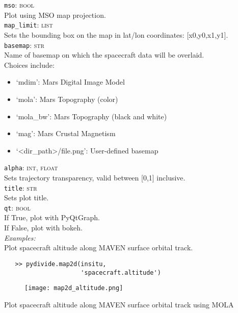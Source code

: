 \documentclass{article}
\begin{document}
\indent \texttt{mso}: \textsc{bool}\\
\indent \indent Plot using MSO map projection.\\
\indent \texttt{map\_limit}: \textsc{list}\\
\indent \indent Sets the bounding box on the map in lat/lon coordinates: [x0,y0,x1,y1].\\
\indent \texttt{basemap}: \textsc{str}\\
\indent \indent Name of basemap on which the spacecraft data will be overlaid.\\
\indent \indent Choices include:\\
\vspace{-7mm}
\begin{itemize}
    \setlength{\itemindent}{2em}
    \item `mdim': Mars Digital Image Model
    \item `mola': Mars Topography (color)
    \item `mola\_bw': Mars Topography (black and white)
    \item `mag': Mars Crustal Magnetism
    \item `<dir\_path>/file.png': User-defined basemap
\end{itemize}
\vspace{-3mm}
\noindent
\indent \texttt{alpha}: \textsc{int, float}\\
\indent \indent Sets trajectory transparency, valid between [0,1] inclusive.\\
\indent \texttt{title}: \textsc{str}\\
\indent \indent Sets plot title.\\
\indent \texttt{qt}: \textsc{bool}\\
\indent \indent If True, plot with PyQtGraph.\\
\indent \indent If False, plot with bokeh.\\
\noindent \textit{Examples:}\\
\indent Plot spacecraft altitude along MAVEN surface orbital track.\\
\vspace{-10mm}
\begin{verbatim}
   >> pydivide.map2d(insitu,
                     'spacecraft.altitude')
\end{verbatim}
\begin{figure}[H]
\centering
\texttt{[image: map2d\_altitude.png]}
\end{figure}
\noindent \indent Plot spacecraft altitude along MAVEN surface orbital track using MOLA\\
\end{document}
